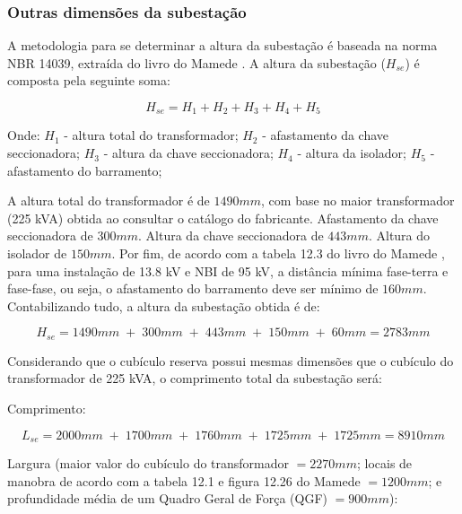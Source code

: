 \subsubsection{Outras dimensões da subestação}


A metodologia para se determinar a altura da subestação é baseada na norma NBR 14039, extraída do livro do Mamede \cite{mamede}. A altura da subestação ($H_{se}$) é composta pela seguinte soma:

\begin{equation}
    H_{se} = H_1 + H_2 + H_3 + H_4 + H_5
\end{equation}

Onde: 
$H_1$ - altura total do transformador;
$H_2$ - afastamento da chave seccionadora;
$H_3$ - altura da chave seccionadora;
$H_4$ - altura da isolador;
$H_5$ - afastamento do barramento;

A altura total do transformador é de $1490mm$, com base no maior transformador (225 kVA) obtida ao consultar o catálogo do fabricante. Afastamento da chave seccionadora de $300mm$. Altura da chave seccionadora de $443mm$. Altura do isolador de $150mm$. Por fim, de acordo com a tabela 12.3 do livro do Mamede \cite{mamede}, para uma instalação de 13.8 kV e NBI de 95 kV, a distância mínima fase-terra e fase-fase, ou seja, o afastamento do barramento deve ser mínimo de $160mm$. Contabilizando tudo, a altura da subestação obtida é de:

\begin{equation}
    H_{se} = 1490mm \;+\; 300mm \;+\; 443mm \;+\; 150mm \;+\; 60mm = 2783mm  
\end{equation}


Considerando que o cubículo reserva possui mesmas dimensões que o cubículo do transformador de 225 kVA, o comprimento total da subestação será:

Comprimento: 

\begin{equation}
    L_{se} = 2000mm \;+\; 1700mm \;+\; 1760mm \;+\; 1725mm \;+\; 1725mm = 8910mm
\end{equation}

Largura (maior valor do cubículo do transformador $= 2270mm$; locais de manobra de acordo com a tabela 12.1 e figura 12.26 do Mamede \cite{mamede} $= 1200mm$; e profundidade média de um Quadro Geral de Força (QGF) $= 900mm$):

